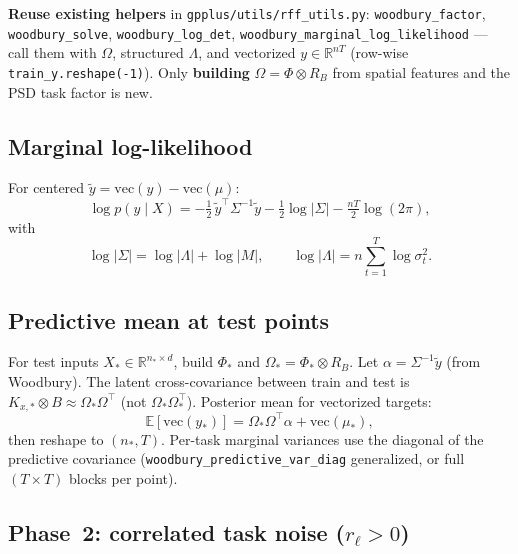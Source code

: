 \documentclass[11pt]{article}
\theoremstyle{plain}
\newcommand{\noise}{\sigma^2}
\newcommand{\Sig}{\Sigma}
\newcommand{\Ph}{\Phi}
\newcommand{\Om}{\Omega}
\newcommand{\RB}{R_B}
\begin{document}
\begin{samebox}
\textbf{Reuse existing helpers} in \texttt{gpplus/utils/rff\_utils.py}:
\texttt{woodbury\_factor}, \texttt{woodbury\_solve}, \texttt{woodbury\_log\_det},
\texttt{woodbury\_marginal\_log\_likelihood} --- call them with $\Om$, structured $\Lambda$,
and vectorized $y \in \mathbb{R}^{nT}$ (row-wise \texttt{train\_y.reshape(-1)}).
Only \textbf{building} $\Om = \Ph \otimes \RB$ from spatial features and the PSD task factor
is new.
\end{samebox}

\subsection{Marginal log-likelihood}

For centered $\tilde{y} = \mathrm{vec}(y) - \mathrm{vec}(\mu)$:
\begin{equation}
  \log p(y \mid X)
  = -\tfrac{1}{2}\,\tilde{y}^\top \Sig^{-1} \tilde{y}
  - \tfrac{1}{2}\log|\Sig|
  - \tfrac{nT}{2}\log(2\pi),
\end{equation}
with
\begin{equation}
  \log|\Sig| = \log|\Lambda| + \log|M|,
  \qquad
  \log|\Lambda| = n \sum_{t=1}^{T} \log \noise_t.
\end{equation}

\subsection{Predictive mean at test points}

For test inputs $X_\ast \in \mathbb{R}^{n_\ast \times d}$, build $\Ph_\ast$ and
$\Om_\ast = \Ph_\ast \otimes \RB$.
Let $\alpha = \Sig^{-1}\tilde{y}$ (from Woodbury).
The latent cross-covariance between train and test is
$K_{x,\ast} \otimes B \approx \Om_\ast \Om^\top$ (not $\Om_\ast \Om_\ast^\top$).
Posterior mean for vectorized targets:
\begin{equation}
  \mathbb{E}[\mathrm{vec}(y_\ast)]
  = \Om_\ast \Om^\top \alpha + \mathrm{vec}(\mu_\ast),
\end{equation}
then reshape to $(n_\ast, T)$.
Per-task marginal variances use the diagonal of the predictive covariance
(\texttt{woodbury\_predictive\_var\_diag} generalized, or full $(T\times T)$ blocks per point).

\subsection{Phase~2: correlated task noise ($r_\ell > 0$)}
\end{document}
